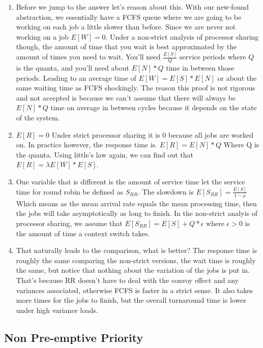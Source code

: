 \begin{enumerate}
  \item Before we jump to the answer let's reason about this.
  With our new-found abstraction, we essentially have a FCFS queue where we are going to be working on each job a little slower than before.      Since we are never not working on a job $E[W] = 0$.
  Under a non-strict analysis of processor sharing though, the amount of time that you wait is best approximated by the amount of times you need to wait.
  You'll need $\frac{E[S]}{Q}$ service periods where $Q$ is the quanta, and you'll need about $E[N] * Q$ time in between those periods.
  Leading to an average time of $E[W] = E[S] * E[N]$ or about the same waiting time as FCFS shockingly. The reason this proof is not rigorous and not accepted is because we can't assume that there will always be $E[N] * Q$ time on average in between cycles because it depends on the state of the system.
  \item $E[R] = 0$ Under strict processor sharing it is 0 because all jobs are worked on. In practice however, the response time is.
  $E[R] = E[N] * Q$ Where Q is the quanta.
  Using little's law again, we can find out that $E[R] = \lambda E[W] * E[S]$.
\item One variable that is different is the amount of service time let the service time for round robin be defined as $S_{RR}$.
  The slowdown is $E[S_{RR}] = \frac{E[S]}{1 - \rho}$
  Which means as the mean arrival rate equals the mean processing time, then the jobs will take asymptotically as long to finish.
  In the non-strict analyis of processor sharing, we assume that
  $E[S_{RR}] = E[S] + Q * \epsilon$ where $\epsilon > 0$ is the amount of time a context switch takes.

  \item That naturally leads to the comparison, what is better? The response time is roughly the same comparing the non-strict versions, the wait time is roughly the same, but notice that nothing about the variation of the jobs is put in.
  That's because RR doesn't have to deal with the convoy effect and any variances associated, otherwise FCFS is faster in a strict sense.
  It also takes more times for the jobs to finish, but the overall turnaround time is lower under high variance loads.
\end{enumerate}

\subsection{Non Pre-emptive Priority}

